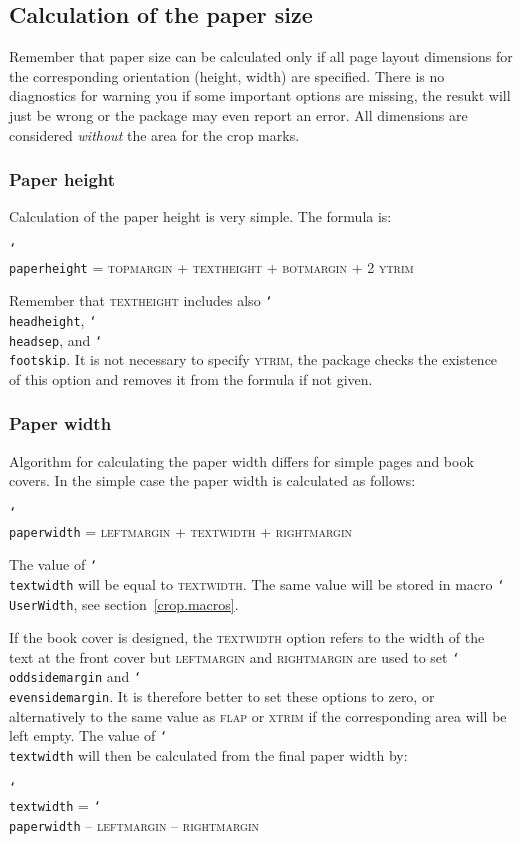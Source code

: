 \documentclass[11pt]{article}
\def\opt#1{\texorpdfstring{\textmd{\textsc{#1}}}{#1}}
\DeclareRobustCommand\cmd[1]{\texttt{\char`\\#1}}
\begin{document}
\subsection{Calculation of the paper size}
Remember that paper size can be calculated only if all page layout dimensions for the corresponding
orientation (height, width) are specified. There is no diagnostics for warning you if some
important options are missing, the resukt will just be wrong or the package may even report an
error. All dimensions are considered \emph{without} the area for the crop marks.

\subsubsection{Paper height}
Calculation of the paper height is very simple. The formula is:

\medskip
\cmd{paperheight} = \opt{topmargin} + \opt{textheight} + \opt{botmargin} + 2 \opt{ytrim}

\medskip \noindent
Remember that \opt{textheight} includes also \cmd{headheight}, \cmd{headsep}, and \cmd{footskip}.
It is not necessary to specify \opt{ytrim}, the package checks the existence of this option and
removes it from the formula if not given.

\subsubsection{Paper width}
Algorithm for calculating the paper width differs for simple pages and book covers. In the simple
case the paper width is calculated as follows:

\medskip
\cmd{paperwidth} = \opt{leftmargin} + \opt{textwidth} + \opt{rightmargin}

\medskip \noindent
The value of \cmd{textwidth} will be equal to \opt{textwidth}. The same value will be stored in
macro \cmd{UserWidth}, see section~\ref{crop.macros}.

If the book cover is designed, the \opt{textwidth} option refers to the width of the text at the
front cover but \opt{leftmargin} and \opt{rightmargin} are used to set \cmd{oddsidemargin} and
\cmd{evensidemargin}. It is therefore better to set these options to zero, or alternatively to the
same value as \opt{flap} or \opt{xtrim} if the corresponding area will be left empty. The value of
\cmd{textwidth} will then be calculated from the final paper width by:

\medskip
\cmd{textwidth} = \cmd{paperwidth} -- \opt{leftmargin} -- \opt{rightmargin}
\end{document}
